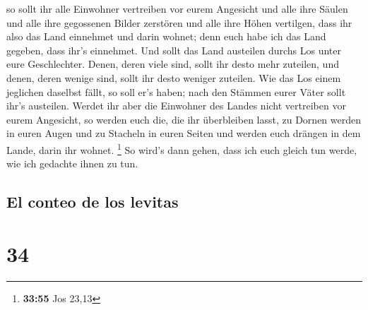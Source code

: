  so sollt ihr alle Einwohner vertreiben vor eurem
Angesicht und alle ihre Säulen und alle ihre gegossenen Bilder zerstören
und alle ihre Höhen vertilgen,  dass ihr also das Land
einnehmet und darin wohnet; denn euch habe ich das Land gegeben, dass
ihr's einnehmet.  Und sollt das Land austeilen durchs Los
unter eure Geschlechter. Denen, deren viele sind, sollt ihr desto mehr
zuteilen, und denen, deren wenige sind, sollt ihr desto weniger
zuteilen. Wie das Los einem jeglichen daselbst fällt, so soll er's
haben; nach den Stämmen eurer Väter sollt ihr's austeilen.
 Werdet ihr aber die Einwohner des Landes nicht
vertreiben vor eurem Angesicht, so werden euch die, die ihr überbleiben
lasst, zu Dornen werden in euren Augen und zu Stacheln in euren Seiten
und werden euch drängen in dem Lande, darin ihr wohnet. \footnote{\textbf{33:55}
  Jos 23,13}  So wird's dann gehen, dass ich euch gleich
tun werde, wie ich gedachte ihnen zu tun.

\hypertarget{el-conteo-de-los-levitas}{%
\subsection{El conteo de los levitas}\label{el-conteo-de-los-levitas}}

\hypertarget{section-33}{%
\section{34}\label{section-33}}

